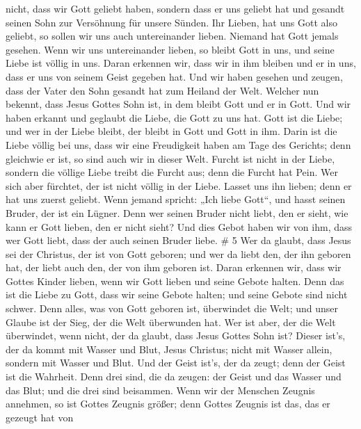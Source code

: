 nicht, dass wir Gott geliebt haben, sondern dass er uns geliebt hat und
gesandt seinen Sohn zur Versöhnung für unsere Sünden.  Ihr
Lieben, hat uns Gott also geliebt, so sollen wir uns auch untereinander
lieben.  Niemand hat Gott jemals gesehen. Wenn wir uns
untereinander lieben, so bleibt Gott in uns, und seine Liebe ist völlig
in uns.  Daran erkennen wir, dass wir in ihm bleiben und er
in uns, dass er uns von seinem Geist gegeben hat.  Und wir
haben gesehen und zeugen, dass der Vater den Sohn gesandt hat zum
Heiland der Welt.  Welcher nun bekennt, dass Jesus Gottes
Sohn ist, in dem bleibt Gott und er in Gott.  Und wir haben
erkannt und geglaubt die Liebe, die Gott zu uns hat. Gott ist die Liebe;
und wer in der Liebe bleibt, der bleibt in Gott und Gott in ihm.
 Darin ist die Liebe völlig bei uns, dass wir eine
Freudigkeit haben am Tage des Gerichts; denn gleichwie er ist, so sind
auch wir in dieser Welt.  Furcht ist nicht in der Liebe,
sondern die völlige Liebe treibt die Furcht aus; denn die Furcht hat
Pein. Wer sich aber fürchtet, der ist nicht völlig in der Liebe.
 Lasset uns ihn lieben; denn er hat uns zuerst geliebt.
 Wenn jemand spricht: „Ich liebe Gott``, und hasst seinen
Bruder, der ist ein Lügner. Denn wer seinen Bruder nicht liebt, den er
sieht, wie kann er Gott lieben, den er nicht sieht?  Und
dies Gebot haben wir von ihm, dass wer Gott liebt, dass der auch seinen
Bruder liebe. \# 5  Wer da glaubt, dass Jesus sei der
Christus, der ist von Gott geboren; und wer da liebt den, der ihn
geboren hat, der liebt auch den, der von ihm geboren ist. 
Daran erkennen wir, dass wir Gottes Kinder lieben, wenn wir Gott lieben
und seine Gebote halten.  Denn das ist die Liebe zu Gott,
dass wir seine Gebote halten; und seine Gebote sind nicht schwer.
 Denn alles, was von Gott geboren ist, überwindet die Welt;
und unser Glaube ist der Sieg, der die Welt überwunden hat. 
Wer ist aber, der die Welt überwindet, wenn nicht, der da glaubt, dass
Jesus Gottes Sohn ist?  Dieser ist's, der da kommt mit
Wasser und Blut, Jesus Christus; nicht mit Wasser allein, sondern mit
Wasser und Blut. Und der Geist ist's, der da zeugt; denn der Geist ist
die Wahrheit.  Denn drei sind, die da zeugen: der Geist und
das Wasser und das Blut;  und die drei sind beisammen.
 Wenn wir der Menschen Zeugnis annehmen, so ist Gottes
Zeugnis größer; denn Gottes Zeugnis ist das, das er gezeugt hat von
